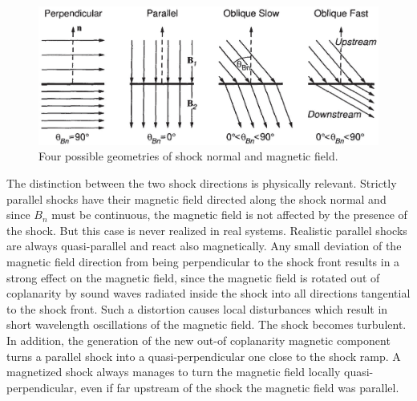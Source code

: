 \documentclass[12pt,a4paper]{article}
\begin{document}
\begin{figure}
\centering
\includegraphics[height=7.cm,angle=0]{shock_geometry.eps}
\caption{
Four possible geometries of shock normal and magnetic field.
} 
\label{fig:shock_geometry}
\end{figure}

The distinction between the two shock directions is physically relevant. Strictly parallel shocks have their magnetic field directed along the shock normal and since $B_n$ must be continuous, the magnetic field is not affected by the presence of the shock. But this case is never realized in real systems. Realistic parallel shocks are always quasi-parallel and react also magnetically. Any small deviation of the magnetic field direction from being perpendicular to the shock front results in a strong effect on the magnetic field, since the magnetic field is rotated out of coplanarity by sound waves radiated inside the shock into all directions tangential to the shock front. Such a distortion causes local disturbances which result in short wavelength oscillations of the magnetic field. The shock becomes turbulent. In addition, the generation of the new out-of coplanarity magnetic component turns a parallel shock into a quasi-perpendicular one close to the shock ramp. A magnetized shock always manages to turn the magnetic field locally quasi-perpendicular, even if far upstream of the shock the magnetic field was parallel.
\end{document}
